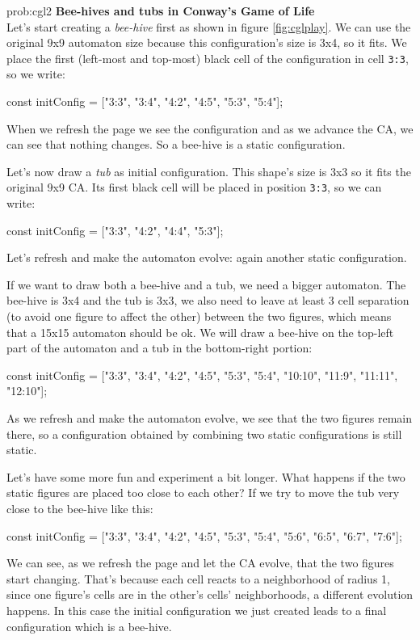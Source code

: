 \begin{sol}{prob:cgl2}
\textbf{Bee-hives and tubs in Conway's Game of Life}\\
Let's start creating a \textit{bee-hive} first as shown in figure \ref{fig:cglplay}. We can use
the original 9x9 automaton size because this configuration's size is 3x4, so it fits.
We place the first (left-most and top-most) black cell of the configuration in cell \texttt{3:3},
so we write:
\begin{code}
const initConfig = ["3:3", "3:4", "4:2", "4:5", "5:3", "5:4"];
\end{code}
When we refresh the page we see the configuration and as we advance the CA, we can see that
nothing changes. So a bee-hive is a static configuration.

Let's now draw a \textit{tub} as initial configuration.
This shape's size is 3x3 so it fits the original 9x9 CA.
Its first black cell will be placed in position \texttt{3:3}, so we can write:
\begin{code}
const initConfig = ["3:3", "4:2", "4:4", "5:3"];
\end{code}
Let's refresh and make the automaton evolve: again another static configuration.

If we want to draw both a bee-hive and a tub, we need a bigger automaton. The bee-hive
is 3x4 and the tub is 3x3, we also need to leave at least 3 cell separation
(to avoid one figure to affect the other) between the two figures, which means that a
15x15 automaton should be ok. We will draw a bee-hive on the top-left part of the automaton
and a tub in the bottom-right portion:
\begin{code}
const initConfig = ["3:3", "3:4", "4:2", "4:5", "5:3", "5:4", "10:10", "11:9", "11:11", "12:10"];
\end{code}
As we refresh and make the automaton evolve, we see that the two figures remain there, so a
configuration obtained by combining two static configurations is still static.

Let's have some more fun and experiment a bit longer. What happens if the two static figures
are placed too close to each other? If we try to move the tub very close to the bee-hive like this:
\begin{code}
const initConfig = ["3:3", "3:4", "4:2", "4:5", "5:3", "5:4", "5:6", "6:5", "6:7", "7:6"];
\end{code}
We can see, as we refresh the page and let the CA evolve, that the two figures start changing.
That's because each cell reacts to a neighborhood of radius 1, since one figure's cells are
in the other's cells' neighborhoods, a different evolution happens. In this case the initial configuration
we just created leads to a final configuration which is a bee-hive.
\end{sol}

